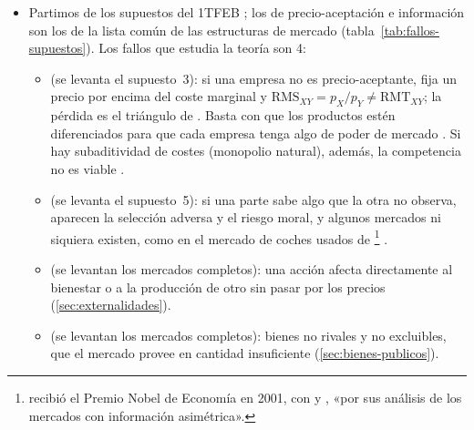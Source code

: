 \documentclass[11pt]{article}
\begin{document}
\begin{itemize}
\item Partimos de los supuestos del 1TFEB ; los de precio-aceptación e información son los de la lista común de las estructuras de mercado  (tabla~\ref{tab:fallos-supuestos}). Los fallos que estudia la teoría son 4:
  \begin{itemize}
  \item {} (se levanta el supuesto~3): si una empresa no es precio-aceptante, fija un precio por encima del coste marginal y $\mathrm{RMS}_{XY}=p_X/p_Y\neq\mathrm{RMT}_{XY}$; la pérdida es el triángulo de    . Basta con que los productos estén diferenciados para que cada empresa tenga algo de poder de mercado . Si hay subaditividad de costes (monopolio natural), además, la competencia no es viable .
  \item {} (se levanta el supuesto~5): si una parte sabe algo que la otra no observa, aparecen la selección adversa y el riesgo moral, y algunos mercados ni siquiera existen, como en el mercado de coches usados de \footnote{ recibió el Premio Nobel de Economía en 2001, con  y , «por sus análisis de los mercados con información asimétrica»\nocite{Nobel2001AkerlofSpenceStiglitz}.} .
  \item {} (se levantan los mercados completos): una acción afecta directamente al bienestar o a la producción de otro sin pasar por los precios (\ref{sec:externalidades}).
  \item {} (se levantan los mercados completos): bienes no rivales y no excluibles, que el mercado provee en cantidad insuficiente (\ref{sec:bienes-publicos}).
  \end{itemize}
\end{itemize}
\end{document}
